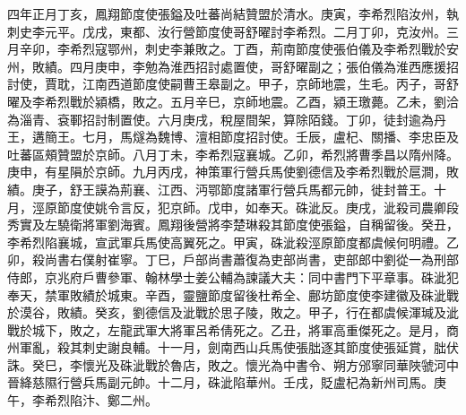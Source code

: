 \begin{pinyinscope}
 四年正月丁亥，鳳翔節度使張鎰及吐蕃尚結贊盟於清水。庚寅，李希烈陷汝州，執刺史李元平。戊戌，東都、汝行營節度使哥舒曜討李希烈。二月丁卯，克汝州。三月辛卯，李希烈寇鄂州，刺史李兼敗之。丁酉，荊南節度使張伯儀及李希烈戰於安州，敗績。四月庚申，李勉為淮西招討處置使，哥舒曜副之；張伯儀為淮西應援招討使，賈耽，江南西道節度使嗣曹王皋副之。甲子，京師地震，生毛。丙子，哥舒曜及李希烈戰於潁橋，敗之。五月辛巳，京師地震。乙酉，潁王璬薨。乙未，劉洽為淄青、袞鄆招討制置使。六月庚戌，稅屋間架，算除陌錢。丁卯，徒封逾為丹王，遘簡王。七月，馬燧為魏博、澶相節度招討使。壬辰，盧杞、關播、李忠臣及吐蕃區頰贊盟於京師。八月丁未，李希烈寇襄城。乙卯，希烈將曹季昌以隋州降。庚申，有星隕於京師。九月丙戌，神策軍行營兵馬使劉德信及李希烈戰於扈澗，敗績。庚子，舒王謨為荊襄、江西、沔鄂節度諸軍行營兵馬都元帥，徙封普王。十月，涇原節度使姚令言反，犯京師。戊申，如奉天。硃泚反。庚戌，泚殺司農卿段秀實及左驍衛將軍劉海賓。鳳翔後營將李楚琳殺其節度使張鎰，自稱留後。癸丑，李希烈陷襄城，宣武軍兵馬使高翼死之。甲寅，硃泚殺涇原節度都虞候何明禮。乙卯，殺尚書右僕射崔寧。丁巳，戶部尚書蕭復為吏部尚書，吏部郎中劉從一為刑部侍郎，京兆府戶曹參軍、翰林學士姜公輔為諫議大夫：同中書門下平章事。硃泚犯奉天，禁軍敗績於城東。辛酉，靈鹽節度留後杜希全、鄜坊節度使李建徽及硃泚戰於漠谷，敗績。癸亥，劉德信及泚戰於思子陵，敗之。甲子，行在都虞候渾瑊及泚戰於城下，敗之，左龍武軍大將軍呂希倩死之。乙丑，將軍高重傑死之。是月，商州軍亂，殺其刺史謝良輔。十一月，劍南西山兵馬使張朏逐其節度使張延賞，朏伏誅。癸巳，李懷光及硃泚戰於魯店，敗之。懷光為中書令、朔方邠寧同華陜虢河中晉絳慈隰行營兵馬副元帥。十二月，硃泚陷華州。壬戌，貶盧杞為新州司馬。庚午，李希烈陷汴、鄭二州。




\end{pinyinscope}

